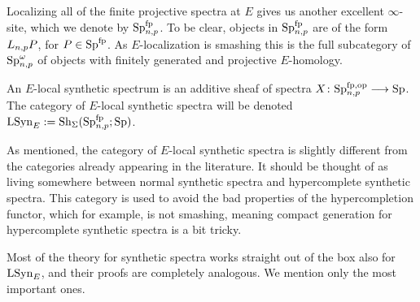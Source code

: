 Localizing all of the finite projective spectra at $E$ gives us another excellent $\infty$-site, which we denote by $\mathrm{Sp}_{n,p}^{\mathrm{fp}}$. To be clear, objects in $\mathrm{Sp}_{n,p}^{\mathrm{fp}}$ are of the form $L_{n,p} P$, for $P\in \mathrm{Sp}^{\mathrm{fp}}$. As $E$-localization is smashing this is the full subcategory of $\mathrm{Sp}_{n,p}^\omega$ of objects with finitely generated and projective $E$-homology.  

\begin{definition}
    An $E$-local synthetic spectrum is an additive sheaf of spectra $X\colon \mathrm{Sp}_{n,p}^{\mathrm{fp}, \mathrm{op}}\longrightarrow \mathrm{Sp}$. The category of $E$-local synthetic spectra will be denoted $\mathrm{LSyn}_{E} := \mathrm{Sh}_\Sigma(\mathrm{Sp}_{n,p}^{\mathrm{fp}};\mathrm{Sp})$. 
\end{definition}

\begin{remark}
    As mentioned, the category of $E$-local synthetic spectra is slightly different from the categories already appearing in the literature. It should be thought of as living somewhere between normal synthetic spectra and hypercomplete synthetic spectra. This category is used to avoid the bad properties of the hypercompletion functor, which for example, is not smashing, meaning compact generation for hypercomplete synthetic spectra is a bit tricky. 
\end{remark}


Most of the theory for synthetic spectra works straight out of the box also for $\mathrm{LSyn}_{E}$, and their proofs are completely analogous. We mention only the most important ones.  

